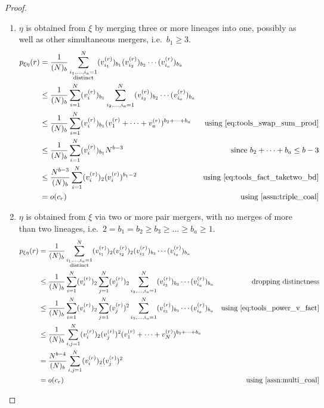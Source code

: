 \documentclass{article}
\begin{document}
\begin{proof}
\begin{enumerate}[label = \textbf{Case \arabic*.}]
\item\label{case:triple_merge} $\eta$ is obtained from $\xi$ by merging three or more lineages into one, possibly as well as other simultaneous mergers, i.e.\ $b_1\geq3$.
\begin{align}
p_{\xi\eta}(r) &= \frac{1}{(N)_b} \sum_{\substack{i_1,\dots,i_a =1 \\ \text{distinct}}}^{N} (v_{i_1}^{(r)})_{b_1}(v_{i_2}^{(r)})_{b_2}\cdots (v_{i_a}^{(r)})_{b_a} &\notag\\
&\leq \frac{1}{(N)_b} \sum_{i=1}^{N} (v_{i}^{(r)})_{b_1} \sum_{i_2,\dots,i_a =1}^{N} (v_{i_2}^{(r)})_{b_2}\cdots (v_{i_a}^{(r)})_{b_a} &\notag\\
&\leq \frac{1}{(N)_b} \sum_{i=1}^{N} (v_{i}^{(r)})_{b_1} (v_1^{(r)}+\dots+v_a^{(r)})^{b_2+\dots+b_a} &\text{using \eqref{eq:tools_swap_sum_prod}} \notag\\
&\leq \frac{1}{(N)_b} \sum_{i=1}^{N} (v_{i}^{(r)})_{b_1} N^{b-3} &\text{since }b_2+\dots+b_a\leq b-3 \label{eq:triplemerge_bound_spinoff}\\
&\leq \frac{N^{b-3}}{(N)_b} \sum_{i=1}^{N} (v_{i}^{(r)})_{2}(v_{i}^{(r)})^{b_1-2}  &\text{using \eqref{eq:tools_fact_taketwo_bd}} \\
&= o(c_r) &\text{using \ref{assn:triple_coal}} \notag
\end{align}

\item\label{case:multi_merge} $\eta$ is obtained from $\xi$ via two or more pair mergers, with no merges of more than two lineages, i.e.\ $2=b_1=b_2\geq b_3\geq\dots\geq b_a\geq1$.
\begin{align}
p_{\xi\eta}(r) &= \frac{1}{(N)_b} \sum_{\substack{i_1,\dots,i_a =1 \\ \text{distinct}}}^{N} (v_{i_1}^{(r)})_2 (v_{i_2}^{(r)})_2 (v_{i_3}^{(r)})_{b_3}\cdots (v_{i_a}^{(r)})_{b_a} &\notag\\
&\leq \frac{1}{(N)_b} \sum_{i=1}^{N} (v_{i}^{(r)})_2 \sum_{j=1}^N (v_j^{(r)})_2 \sum_{i_3,\dots,i_a =1}^{N} (v_{i_3}^{(r)})_{b_3}\cdots (v_{i_a}^{(r)})_{b_a} &\text{dropping distinctness}\notag\\
&\leq \frac{1}{(N)_b} \sum_{i=1}^{N} (v_{i}^{(r)})_2 \sum_{j=1}^N (v_j^{(r)})^2 \sum_{i_3,\dots,i_a =1}^{N} (v_{i_3}^{(r)})_{b_3}\cdots (v_{i_a}^{(r)})_{b_a} &\text{using \eqref{eq:tools_power_v_fact}} \notag\\
&\leq \frac{1}{(N)_b} \sum_{i,j=1}^{N} (v_{i}^{(r)})_2 (v_j^{(r)})^2 (v_1^{(r)}+\dots+v_N^{(r)})^{b_3+\dots +b_a} &\notag\\
&=\frac{N^{b-4}}{(N)_b} \sum_{i,j=1}^N (v_{i}^{(r)})_2 (v_j^{(r)})^2 & \\
&= o(c_r) &\text{using \ref{assn:multi_coal}} \notag
\end{align}


\end{enumerate}
\end{proof}
\end{document}
